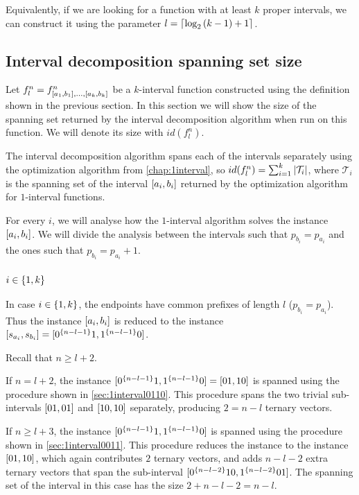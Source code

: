 Equivalently,
if we are looking for a  function
with at least $k$ proper intervals,
we can construct it using the parameter
$l = \lceil\log_2{(k-1)} + 1\rceil$.

\subsection{Interval decomposition spanning set size}

Let $f_l^n =
f^n_{[a_1, b_1], \ldots, [a_k, b_k]}$
be a $k$-interval function
constructed using the definition
shown in the previous section.
In this section we will show the size of the spanning set
returned by the interval decomposition algorithm
when run on this function.
We will denote its size with $id(f_l^n)$.

The interval decomposition algorithm spans
each of the intervals separately
using the optimization algorithm
from \autoref{chap:1interval},
so $id(f_l^n) = \sum_{i=1}^k{\lvert\mathcal{T}_i\rvert}$,
where $\mathcal{T}_i$ is the spanning set
of the interval $[a_i, b_i]$
returned by the optimization algorithm
for $1$-interval functions.

For every $i$,
we will analyse how the $1$-interval algorithm solves
the instance $[a_i, b_i]$.
We will divide the analysis between the intervals
such that $p_{b_i} = p_{a_i}$
and the ones such that $p_{b_i} = p_{a_i} + 1$.

\subsubsection{$i \in \{1, k\}$}

In case $i \in \{1, k\}$,
the endpoints have common prefixes of length $l$
($p_{b_i} = p_{a_i}$).
Thus the instance $[a_i, b_i]$
is reduced to the instance
$[s_{a_i}, s_{b_i}]
= [0^{\{n-l-1\}} 1, 1^{\{n-l-1\}} 0]$.

Recall that $n \geq l + 2$.

If $n = l + 2$,
the instance
$[0^{\{n-l-1\}} 1, 1^{\{n-l-1\}} 0]
= [01, 10]$
is spanned using the procedure
shown in \autoref{sec:1interval0110}.
This procedure spans the two trivial sub-intervals
$[01, 01]$ and $[10, 10]$
separately,
producing $2 = n-l$ ternary vectors.

If $n \geq l + 3$,
the instance
$[0^{\{n-l-1\}} 1, 1^{\{n-l-1\}} 0]$
is spanned using the procedure
shown in \autoref{sec:1interval0011}.
This procedure reduces the instance
to the instance $[01, 10]$,
which again contributes $2$ ternary vectors,
and adds $n-l-2$ extra ternary vectors
that span the sub-interval
$[0^{\{n-l-2\}} 10, 1^{\{n-l-2\}} 01]$.
The spanning set of the interval in this case has the size
$2 + n - l - 2 = n - l$.

